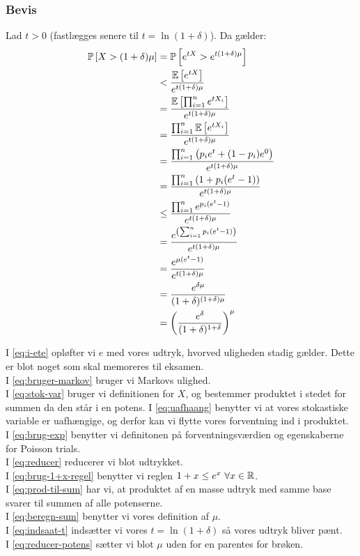\subsubsection{Bevis}
Lad $t > 0$ (fastlægges senere til $t = \ln(1 + \delta)$). Da gælder:
\begin{align}
  \mathbb{P} \left[  X > (1+\delta) \mu  \right]
  &= \mathbb{P} \left[  e^{tX} > e^{t(1+\delta) \mu}  \right] \label{eq:i-ete} \\
  &< \frac{\mathbb{E} \left[  e^{tX}  \right]}{e^{t(1+\delta) \mu}} \label{eq:bruger-markov} \\
  &= \frac{\mathbb{E} \left[  \prod_{i=1}^n e^{t X_i}  \right]}{e^{t(1+\delta) \mu}} \label{eq:stok-var} \\
  &= \frac{\prod_{i=1}^n \mathbb{E} \left[  e^{t X_i}  \right]}{e^{t(1+\delta) \mu}} \label{eq:uafhaang} \\
  &= \frac{\prod_{i=1}^n \left( p_i e^t + (1-p_i) e^0  \right)}{e^{t(1+\delta) \mu}} \label{eq:brug-exp} \\
  &= \frac{\prod_{i=1}^n \left( 1 + p_i (e^t - 1) \right)}{e^{t(1+\delta) \mu}} \label{eq:reducer} \\
  &\leq \frac{\prod_{i=1}^n e^{p_i (e^t - 1)}}{e^{t(1+\delta) \mu}} \label{eq:brug-1+x-regel} \\
  &= \frac{e^{\left( \sum_{i=1}^n p_i (e^t - 1) \right)}}{e^{t(1+\delta) \mu}} \label{eq:prod-til-sum} \\
  &= \frac{e^{\mu (e^t - 1)}}{e^{t(1+\delta) \mu}} \label{eq:beregn-sum} \\
  &= \frac{e^{\delta \mu}}{(1 + \delta)^{(1 + \delta) \mu}} \label{eq:indsaat-t} \\
  &= \left(  \frac{e^\delta}{(1 + \delta)^{1 + \delta}}  \right)^\mu \label{eq:reducer-potens}
\end{align}

I \cref{eq:i-ete} opløfter vi $e$ med vores udtryk, hvorved uligheden stadig gælder. Dette er blot noget som skal memoreres til eksamen.\\
I \cref{eq:bruger-markov} bruger vi Markovs ulighed.\\
I \cref{eq:stok-var} bruger vi definitionen for $X$, og bestemmer produktet i stedet for summen da den står i en potens.
I \cref{eq:uafhaang} benytter vi at vores stokastiske variable er uafhængige, og derfor kan vi flytte vores forventning ind i produktet.\\
I \cref{eq:brug-exp} benytter vi definitonen på forventningsværdien og egenskaberne for Poisson trials.\\
I \cref{eq:reducer} reducerer vi blot udtrykket.\\
I \cref{eq:brug-1+x-regel} benytter vi reglen $1 + x \leq e^x \ \forall x \in {\mathbb R}$.\\
I \cref{eq:prod-til-sum} har vi, at produktet af en masse udtryk med samme base svarer til summen af alle potenserne.\\
I \cref{eq:beregn-sum} benytter vi vores definition af $\mu$.\\
I \cref{eq:indsaat-t} indsætter vi vores $t = \ln(1 + \delta)$ så vores udtryk bliver pænt.\\
I \cref{eq:reducer-potens} sætter vi blot $\mu$ uden for en parentes for brøken.



